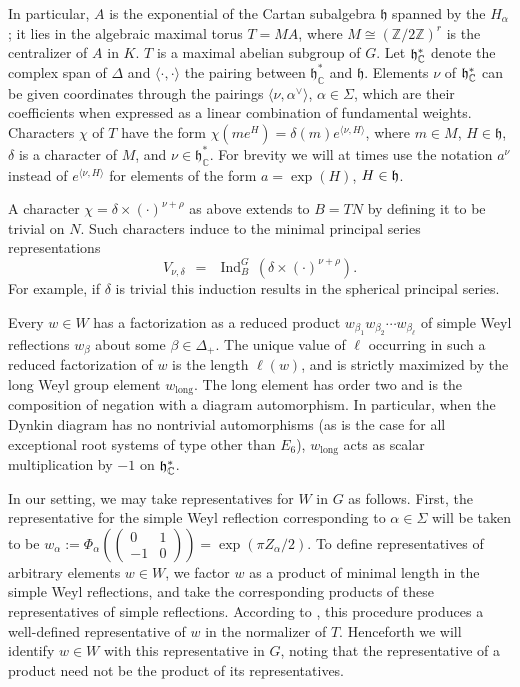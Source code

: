 \documentclass[12pt]{article}
\numberwithin{equation}{section}
\renewcommand\a{\alpha}
\renewcommand\d{\delta}
\newcommand{\Z}{{\mathbb{Z}}}
\newcommand{\C}{{\mathbb{C}}}
\renewcommand\({\left(}
\renewcommand\){\right)}
\newcommand{\ttwo}[4]{
\(\begin{smallmatrix}{#1} & {#2}
\\ {#3} & {#4} \end{smallmatrix}\)}
\begin{document}
In particular, $A$ is the exponential of the Cartan subalgebra $\mathfrak{h}$ spanned by the $H_\a$; it lies in the algebraic maximal torus $T=MA$, where $M\cong (\Z/2\Z)^{r}$ is the centralizer of $A$ in $K$.  $T$ is a maximal abelian subgroup of $G$.
Let $\frak h^*_{\C}$ denote the complex span of $\Delta$ and $\langle \cdot,\cdot \rangle$  the pairing between $\mathfrak{h}_\C^*$ and $\mathfrak{h}$.  Elements $\nu$ of $\frak h^*_{\C}$ can be given coordinates through the pairings $\langle \nu,\alpha^\vee\rangle$, $\a\in\Sigma$, which are their coefficients when expressed as a linear combination of fundamental weights.
    Characters $\chi$ of $T$ have the form $\chi(me^H)=\delta(m)e^{\langle \nu,H\rangle}$, where  $m\in M$, $H\in \mathfrak{h}$, $\delta$ is a character of $M$, and $\nu\in\mathfrak{h}_\C^*$.  For brevity we will at times use the notation $a^\nu$ instead of $e^{\langle \nu,H\rangle}$ for elements of the form $a=\exp(H)$, $H\in \frak h$.

A character $\chi=\delta \times (\cdot)^{\nu+\rho}$ as above extends to $B=TN$ by defining it to be trivial on $N$.  Such characters induce to the minimal principal series representations
\begin{equation}\label{princseries}
  V_{\nu,\delta} \ \ = \ \ \operatorname{Ind}_B^G\,\(\d \times (\cdot)^{\nu+\rho}\).
\end{equation}
  For example, if $\delta$ is trivial this induction results in the spherical principal series.

Every $w\in W$ has a factorization as a reduced product $w_{\beta_1}w_{\beta_2}\cdots w_{\beta_\ell}$ of simple Weyl reflections $w_\beta$ about some $\beta\in\Delta_+$.  The unique value of $\ell$  occurring in such a reduced factorization of $w$ is the length $\ell(w)$, and is strictly maximized by the long Weyl group element $w_{\text{long}}$.  The long element has order two and is the composition of negation with a diagram automorphism.  In particular, when the Dynkin diagram has no nontrivial automorphisms (as is the case for all exceptional root systems of type other than $E_6$), $w_{\text{long}}$ acts as scalar multiplication by $-1$ on ${\frak h}^*_{\C}$.

In our setting, we may take representatives for $W$ in $G$ as follows.  First, the representative for the simple Weyl reflection corresponding to $\a\in\Sigma$ will be taken to be $w_\a:=\Phi_\a(\ttwo 0{1}{-1}0)=\exp(\pi Z_\a/2)$.  To define representatives of arbitrary elements $w\in W$, we factor $w$ as a product of minimal length in the simple Weyl reflections, and take the corresponding products of these representatives of simple reflections.  According to \cite[Lemma 83b]{Steinberg}, this procedure produces a well-defined representative of $w$ in the normalizer of $T$.  Henceforth we will identify $w\in W$ with this representative in $G$, noting that the representative of a product need not be the product of its representatives.
\end{document}
